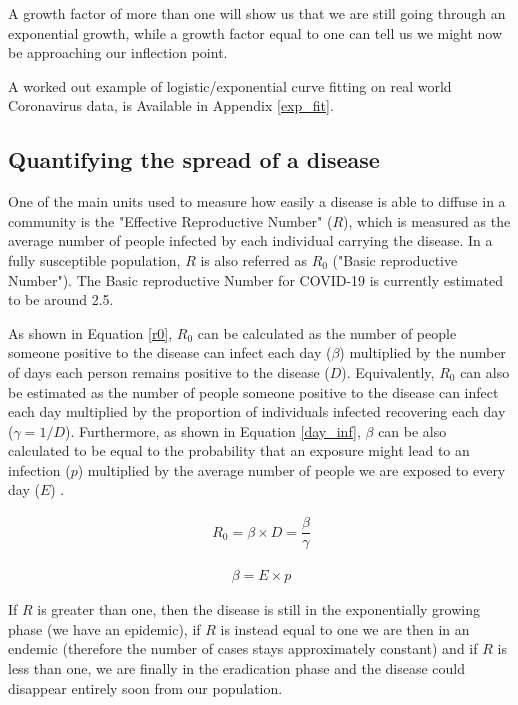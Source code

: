 A growth factor of more than one will show us that we are still going through an exponential growth, while a growth factor equal to one can tell us we might now be approaching our inflection point.

A worked out example of logistic/exponential curve fitting on real world Coronavirus data, is Available in Appendix \ref{exp_fit}.

\subsection{Quantifying the spread of a disease}
One of the main units used to measure how easily a disease is able to diffuse in a community is the "Effective Reproductive Number" ($R$), which is measured as the average number of people infected by each individual carrying the disease. In a fully susceptible population, $R$ is also referred as $R_{0}$ ("Basic reproductive Number"). The Basic reproductive Number for COVID-19 is currently estimated to be around 2.5.

As shown in Equation \ref{r0}, $R_{0}$ can be calculated as the number of people someone positive to the disease can infect each day ($\beta$) multiplied by the number of days each person remains positive to the disease ($D$). Equivalently, $R_{0}$ can also be estimated as the number of people someone positive to the disease can infect each day multiplied by the proportion of individuals infected recovering each day ($\gamma = 1/D$). Furthermore, as shown in Equation \ref{day_inf}, $\beta$ can be also calculated to be equal to the probability that an exposure might lead to an infection ($p$) multiplied by the average number of people we are exposed to every day ($E$) \cite{tds}.

\useshortskip
\begin{align}
\ R_{0} = \beta \times D = \dfrac{\beta}{\gamma}
\label{r0}
\end{align}
\useshortskip

\useshortskip
\begin{align}
\ \beta = E \times p
\label{day_inf}
\end{align}
\useshortskip

If $R$ is greater than one, then the disease is still in the exponentially growing phase (we have an epidemic), if $R$ is instead equal to one we are then in an endemic (therefore the number of cases stays approximately constant) and if $R$ is less than one, we are finally in the eradication phase and the disease could disappear entirely soon from our population.

